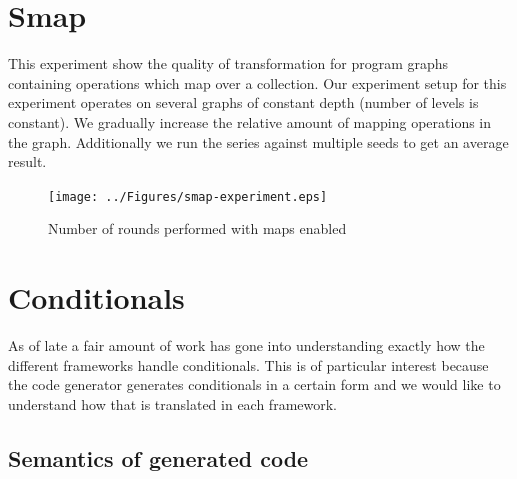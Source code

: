 \section{Smap}

This experiment show the quality of transformation for program graphs containing operations which map over a collection.
Our experiment setup for this experiment operates on several graphs of constant depth (number of levels is constant).
We gradually increase the relative amount of mapping operations in the graph.
Additionally we run the series against multiple seeds to get an average result.

\begin{figure}
    \texttt{[image: ../Figures/smap-experiment.eps]}
    \caption{Number of rounds performed with maps enabled}
\end{figure}

\section{Conditionals}


As of late a fair amount of work has gone into understanding exactly how the different frameworks handle conditionals.
This is of particular interest because the code generator generates conditionals in a certain form and we would like to understand how that is translated in each framework.

\subsection{Semantics of generated code}

